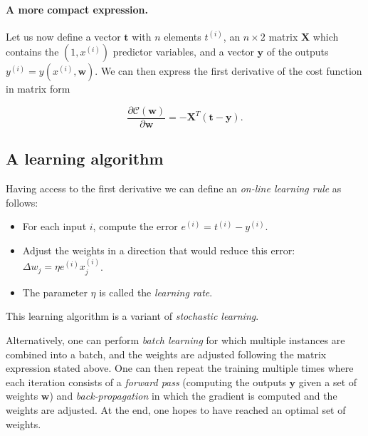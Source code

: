 \documentclass[%
oneside,                 %
final,                   %
10pt]{article}
\newenvironment{notice_mdfboxadmon}[1][]{
\begin{notice_mdfboxmdframed}[frametitle=#1]
}
{
\end{notice_mdfboxmdframed}
}
\begin{document}
\paragraph{A more compact expression.}
Let us now define a vector $\boldsymbol{t}$ with $n$ elements $t^{(i)}$, an
$n\times 2$ matrix $\boldsymbol{X}$ which contains the $(1, x^{(i)})$ predictor variables, and a
vector $\boldsymbol{y}$ of the outputs $y^{(i)} = y(x^{(i)},\boldsymbol{w})$. We can then express the first
derivative of the cost function in matrix form

\[
\frac{\partial \mathcal{C}(\boldsymbol{w})}{\partial \boldsymbol{w}} = -\boldsymbol{X}^T\left( \boldsymbol{t}-\boldsymbol{y} \right). 
\]

\subsection{A learning algorithm}


\begin{notice_mdfboxadmon}[Notice]
Having access to the first derivative we can define an \emph{on-line learning rule} as follows:
\begin{itemize}
\item For each input $i$, compute the error $e^{(i)} = t^{(i)} - y^{(i)}$.

\item Adjust the weights in a direction that would reduce this error: $\Delta w_j = \eta e^{(i)} x_j^{(i)}$.

\item The parameter $\eta$ is called the \emph{learning rate}.
\end{itemize}

\noindent
This learning algorithm is a variant of \emph{stochastic learning}.
\end{notice_mdfboxadmon} %



Alternatively, one can perform \emph{batch learning} for which multiple instances are combined into a batch, and the weights are adjusted following the matrix expression stated above. One can then repeat the training multiple times where each iteration consists of a \emph{forward pass} (computing the outputs $\boldsymbol{y}$ given a set of weights $\boldsymbol{w}$) and \emph{back-propagation} in which the gradient is computed and the weights are adjusted. At the end, one hopes to have reached an optimal set of weights.

\end{document}
